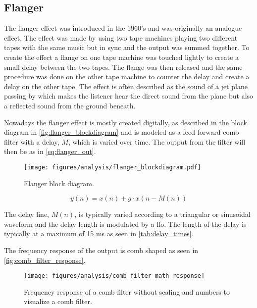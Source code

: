 \subsection{Flanger}
\label{ssub:flanger}

The flanger effect was introduced in the 1960's and was originally an analogue effect. The effect was made by using two tape machines playing two different tapes with the same music but in sync and the output was summed together. To create the effect a flange on one tape machine was touched lightly to create a small delay between the two tapes. The flange was then released and the same procedure was done on the other tape machine to counter the delay and create a delay on the other tape. The effect is often described as the sound of a jet plane passing by which makes the listener hear the direct sound from the plane but also a reflected sound from the ground beneath. 

Nowadays the flanger effect is mostly created digitally, as described in the block diagram in \autoref{fig:flanger_blockdiagram} and is modeled as a feed forward comb filter with a delay, $M$, which is varied over time. The output from the filter will then be as in \autoref{eq:flanger_out}.

\begin{figure}[htbp]
	\centering
	\texttt{[image: figures/analysis/flanger\_blockdiagram.pdf]}
	\caption{Flanger block diagram.}
	\label{fig:flanger_blockdiagram}
\end{figure}

\begin{equation}
	y(n)=x(n)+g \cdot x(n-M(n))
	\label{eq:flanger_out}
\end{equation}

\startexplain
\stopexplain

The delay line, $M(n)$, is typically varied according to a triangular or sinusoidal waveform and the delay length is modulated by a \gls{lfo}. The length of the delay is typically at a maximum of 15 ms as seen in \autoref{tab:delay_times}.  

The frequency response of the output is comb shaped as seen in \autoref{fig:comb_filter_response}.  

\begin{figure}[htbp]
	\centering
	\texttt{[image: figures/analysis/comb\_filter\_math\_response]}
	\caption{Frequency response of a comb filter without scaling and numbers to visualize a comb filter.}
	\label{fig:comb_filter_response}
\end{figure}

